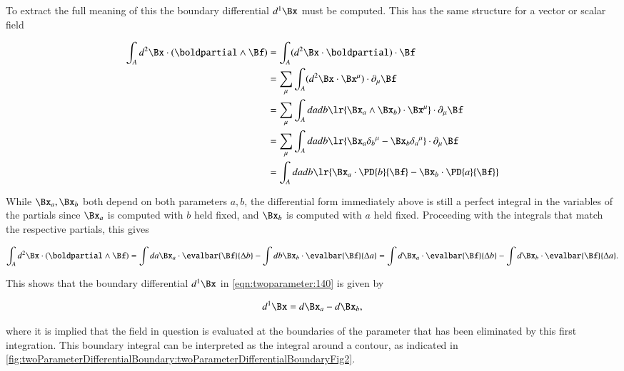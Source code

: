 To extract the full meaning of this the boundary differential \( d^1 \Bx \) must be computed.
This has the same structure for a vector or scalar field

\begin{dmath}\label{eqn:twoparameter:220}
\begin{aligned}
\int_A d^2 \Bx \cdot (\boldpartial \wedge \Bf)
&=
\int_A (d^2 \Bx \cdot \boldpartial) \cdot \Bf \\
&=
\sum_\mu \int_A (d^2 \Bx \cdot \Bx^\mu) \cdot \partial_\mu \Bf \\
&=
\sum_\mu \int_A da db  \lr{ \Bx_a \wedge \Bx_b ) \cdot \Bx^\mu } \cdot \partial_\mu \Bf \\
&=
\sum_\mu \int_A da db  \lr{ \Bx_a {\delta_b}^\mu - \Bx_b {\delta_a}^\mu } \cdot \partial_\mu \Bf \\
&=
\int_A da db  \lr{ \Bx_a \cdot \PD{b}{ \Bf} - \Bx_b \cdot \PD{a}{\Bf} }
\end{aligned}
\end{dmath}

While \( \Bx_a, \Bx_b \) both depend on both parameters \( a, b \), the differential form immediately above is still a perfect integral in the variables of the partials since \( \Bx_a \) is computed with \( b \) held fixed, and \( \Bx_b \) is computed with \( a \) held fixed.
Proceeding with the integrals that match the respective partials, this gives

\begin{dmath}\label{eqn:twoparameter:240}
\int_A d^2 \Bx \cdot (\boldpartial \wedge \Bf)
=
\int
da \Bx_a \cdot \evalbar{\Bf}{\Delta b}
-\int
db \Bx_b \cdot \evalbar{\Bf}{\Delta a}
=
\int
d\Bx_a \cdot \evalbar{\Bf}{\Delta b}
-\int
d\Bx_b \cdot \evalbar{\Bf}{\Delta a}.
\end{dmath}

This shows that the boundary differential \( d^1 \Bx \) in \cref{eqn:twoparameter:140} is given by

\begin{dmath}\label{eqn:twoparameter:260}
d^1 \Bx = d\Bx_a - d\Bx_b,
\end{dmath}

where it is implied that the field in question is evaluated at the boundaries of the parameter that has been eliminated by this first integration.
This boundary integral can be interpreted as the integral around a contour, as indicated in
\cref{fig:twoParameterDifferentialBoundary:twoParameterDifferentialBoundaryFig2}.


